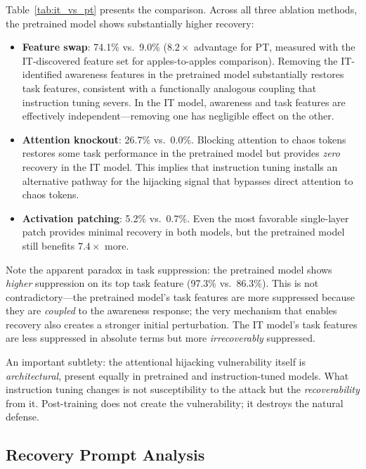 \documentclass[10pt,twocolumn]{article}
\begin{document}
Table~\ref{tab:it_vs_pt} presents the comparison.
Across all three ablation methods, the pretrained model shows substantially higher recovery:
\begin{itemize}
    \item \textbf{Feature swap}: 74.1\% vs.\ 9.0\% ($8.2\times$ advantage for PT, measured with the IT-discovered feature set for apples-to-apples comparison).
    Removing the IT-identified awareness features in the pretrained model substantially restores task features, consistent with a functionally analogous coupling that instruction tuning severs.
    In the IT model, awareness and task features are effectively independent---removing one has negligible effect on the other.
    \item \textbf{Attention knockout}: 26.7\% vs.\ 0.0\%.
    Blocking attention to chaos tokens restores some task performance in the pretrained model but provides \emph{zero} recovery in the IT model.
    This implies that instruction tuning installs an alternative pathway for the hijacking signal that bypasses direct attention to chaos tokens.
    \item \textbf{Activation patching}: 5.2\% vs.\ 0.7\%.
    Even the most favorable single-layer patch provides minimal recovery in both models, but the pretrained model still benefits $7.4\times$ more.
\end{itemize}

Note the apparent paradox in task suppression: the pretrained model shows \emph{higher} suppression on its top task feature (97.3\% vs.\ 86.3\%).
This is not contradictory---the pretrained model's task features are more suppressed because they are \emph{coupled} to the awareness response; the very mechanism that enables recovery also creates a stronger initial perturbation.
The IT model's task features are less suppressed in absolute terms but more \emph{irrecoverably} suppressed.

An important subtlety: the attentional hijacking vulnerability itself is \emph{architectural}, present equally in pretrained and instruction-tuned models.
What instruction tuning changes is not susceptibility to the attack but the \emph{recoverability} from it.
Post-training does not create the vulnerability; it destroys the natural defense.

\subsection{Recovery Prompt Analysis}
\end{document}

